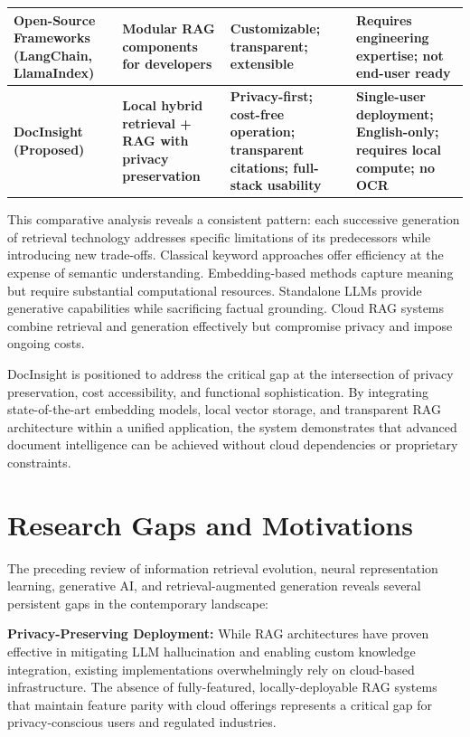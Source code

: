 \begin{table}[H]
{\begin{tabular}{|p{3.2cm}|p{3.0cm}|p{3.5cm}|p{3.8cm}|}
\hline
Open-Source Frameworks (LangChain, LlamaIndex) & Modular RAG components for developers & Customizable; transparent; extensible & Requires engineering expertise; not end-user ready \\ 
\hline
\textbf{DocInsight (Proposed)} & \textbf{Local hybrid retrieval + RAG with privacy preservation} & \textbf{Privacy-first; cost-free operation; transparent citations; full-stack usability} & \textbf{Single-user deployment; English-only; requires local compute; no OCR} \\ 
\hline
\end{tabular}%
}
\end{table}

This comparative analysis reveals a consistent pattern: each successive generation of retrieval technology addresses specific limitations of its predecessors while introducing new trade-offs. Classical keyword approaches offer efficiency at the expense of semantic understanding. Embedding-based methods capture meaning but require substantial computational resources. Standalone LLMs provide generative capabilities while sacrificing factual grounding. Cloud RAG systems combine retrieval and generation effectively but compromise privacy and impose ongoing costs.

DocInsight is positioned to address the critical gap at the intersection of privacy preservation, cost accessibility, and functional sophistication. By integrating state-of-the-art embedding models, local vector storage, and transparent RAG architecture within a unified application, the system demonstrates that advanced document intelligence can be achieved without cloud dependencies or proprietary constraints.

\section{Research Gaps and Motivations}

The preceding review of information retrieval evolution, neural representation learning, generative AI, and retrieval-augmented generation reveals several persistent gaps in the contemporary landscape:

\textbf{Privacy-Preserving Deployment:} While RAG architectures have proven effective in mitigating LLM hallucination and enabling custom knowledge integration, existing implementations overwhelmingly rely on cloud-based infrastructure. The absence of fully-featured, locally-deployable RAG systems that maintain feature parity with cloud offerings represents a critical gap for privacy-conscious users and regulated industries.

